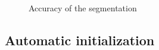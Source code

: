 \begin{figure} \centering
  \caption{Accuracy of the segmentation}
\end{figure}


\subsection{Automatic initialization}


